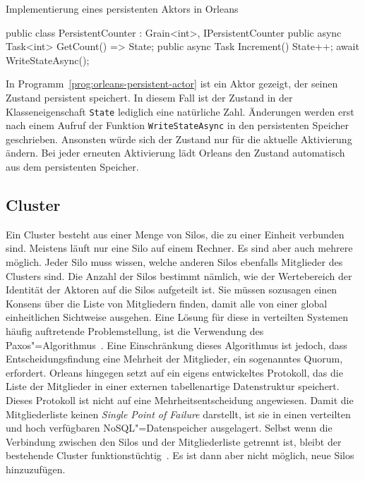 \begin{program}[!hbt]
\caption{Implementierung eines persistenten Aktors in Orleans}
\label{prog:orleans-persistent-actor}
\begin{CsCode}
[StorageProvider(ProviderName="<provider-name>")]
public class PersistentCounter : Grain<int>, IPersistentCounter   {
	public async Task<int> GetCount() => State;
	public async Task Increment() {
		State++;
		await WriteStateAsync();
	}
}
\end{CsCode}
\end{program}

In Programm~\ref{prog:orleans-persistent-actor} ist ein Aktor gezeigt, der seinen Zustand persistent speichert. In diesem Fall ist der Zustand in der Klasseneigenschaft \lstinline{State} lediglich eine natürliche Zahl. Änderungen werden erst nach einem Aufruf der Funktion \lstinline{WriteStateAsync} in den persistenten Speicher geschrieben. Ansonsten würde sich der Zustand nur für die aktuelle Aktivierung ändern. Bei jeder erneuten Aktivierung lädt Orleans den Zustand automatisch aus dem persistenten Speicher.

\subsection{Cluster}

Ein Cluster besteht aus einer Menge von Silos, die zu einer Einheit verbunden sind. Meistens läuft nur eine Silo auf einem Rechner. Es sind aber auch mehrere möglich. Jeder Silo muss wissen, welche anderen Silos ebenfalls Mitglieder des Clusters sind. Die Anzahl der Silos bestimmt nämlich, wie der  Wertebereich der Identität der Aktoren auf die Silos aufgeteilt ist. Sie müssen sozusagen einen Konsens über die Liste von Mitgliedern finden, damit alle von einer global einheitlichen Sichtweise ausgehen. Eine Lösung für diese in verteilten Systemen häufig auftretende Problemstellung, ist die Verwendung des Paxos"=Algorithmus~\cite{Lamport:1998:PP:279227.279229}. Eine Einschränkung dieses Algorithmus ist jedoch, dass Entscheidungsfindung eine Mehrheit der Mitglieder, ein sogenanntes Quorum, erfordert. Orleans hingegen setzt auf ein eigens entwickeltes Protokoll, das die Liste der Mitglieder in einer externen tabellenartige Datenstruktur speichert. Dieses Protokoll ist nicht auf eine Mehrheitsentscheidung angewiesen. Damit die Mitgliederliste keinen \textit{Single Point of Failure} darstellt, ist sie in einen verteilten und hoch verfügbaren NoSQL"=Datenspeicher ausgelagert. Selbst wenn die Verbindung zwischen den Silos und der Mitgliederliste getrennt ist, bleibt der bestehende Cluster funktionstüchtig~\cite{OrleansErlangGlasses}. Es ist dann aber nicht möglich, neue Silos hinzuzufügen.

